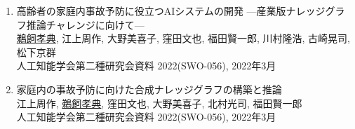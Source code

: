 \documentclass[dvipdfmx]{jlreq}
\begin{document}
\begin{enumerate}
\begin{enumerate}
\begin{enumerate}[label=\arabic*,align=right, labelsep=3pt]
古崎晃司, 江上周作, 松下京群, \underline{鵜飼孝典}, 川村隆浩\\
人工知能学会全国大会論文集 第36回 (2022), 2022年6月
\item 高齢者の家庭内事故予防に役立つAIシステムの開発 —産業版ナレッジグラフ推論チャレンジに向けて—\\
\underline{鵜飼孝典}, 江上周作, 大野美喜子, 窪田文也, 福田賢一郎, 川村隆浩, 古崎晃司, 松下京群\\
人工知能学会第二種研究会資料 2022(SWO-056), 2022年3月
\item 家庭内の事故予防に向けた合成ナレッジグラフの構築と推論\\
江上周作, \underline{鵜飼孝典}, 窪田文也, 大野美喜子, 北村光司, 福田賢一郎\\
人工知能学会第二種研究会資料 2022(SWO-056), 2022年3月
\end{enumerate}
\end{enumerate}
\end{enumerate}
\end{document}
